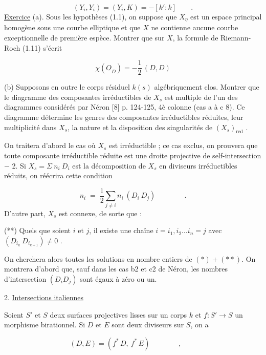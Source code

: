 \begin{equation*}
(Y_i,Y_i) = (Y_i,K) = -[k':k] \qquad .
\end{equation*}
\underline{Exercice} (a). Sous les hypothèses (1.1), on suppose que $X_\eta$ est un espace principal homogène sous une courbe elliptique et que $X$ ne contienne aucune courbe exceptionnelle de première espèce. Montrer que sur $X$, la formule de Riemann-Roch (1.11) s'écrit

\begin{equation*}
\chi(\underline{O}_D) = - \frac{1}{2} \, (D,D)
\end{equation*}


(b) Supposons en outre le corps résiduel $k(s)$ algébriquement clos. Montrer que le diagramme des composantes irréductibles de $X_s$ est multiple de l'un des diagrammes considérés par Néron [8] p. 124-125, 4è colonne (cas a à c 8). Ce diagramme détermine les genres des composantes irréductibles réduites, leur multiplicité dans $X_s$, la nature et la disposition des singularités de $(X_s)_{\mathrm{red}}$ .

On traitera d'abord le cas où $X_s$ est irréductible ; ce cas exclus, on prouvera que toute composante irréductible réduite est une droite projective de self-intersection $-$ 2. Si $X_s = \Sigma\ n_i\ D_i$ est la décomposition de $X_s$ en diviseurs irréductibles réduits, on réécrira cette condition

\begin{equation}\tag{*}
n_i \;=\; \frac{1}{2} \sum_{j \neq i} n_i \ (D_i\ D_j) \qquad\qquad .
\end{equation}
D'autre part, $X_s$ est connexe, de sorte que :

(**) Quels que soient $i$ et $j$, il existe une chaîne $i = i_1, i_2 \ldots i_n = j$ avec $(D_{i_k}\ D_{i_{k+1}}) \neq 0$ .

On cherchera alors toutes les solutions en nombre entiers de $(*) + (**)$. On montrera d'abord que, sauf dans les cas b2 et c2 de Néron, les nombres d'intersection $(D_i D_j)$ sont égaux à zéro ou un.


2. \underline{Intersections italiennes}

Soient $S'$ et $S$ deux surfaces projectives lisses sur un corps $k$ et $f : S' \longrightarrow S$ un morphisme birationnel. Si $D$ et $E$ sont deux diviseurs sur $S$, on a

\begin{equation*}
(D,E) = (f^* \, D, \ f^* \, E) \qquad\qquad , \qquad 
\end{equation*}

